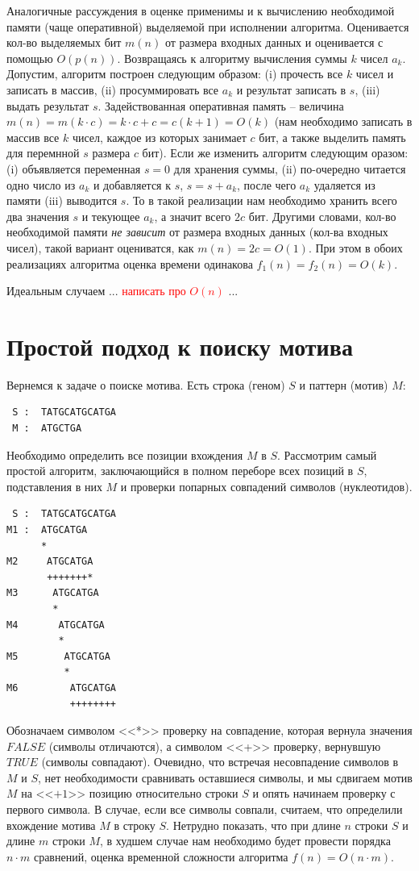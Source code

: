 \documentclass[letterpaper, 11pt]{article}
\begin{document}
Аналогичные рассуждения в оценке применимы и к вычислению необходимой памяти (чаще оперативной) выделяемой
при исполнении алгоритма. Оценивается кол-во выделяемых бит $m(n)$ от размера входных данных и оценивается с помощью
$O(p(n))$. Возвращаясь к алгоритму вычисления суммы $k$ чисел $a_k$. Допустим, алгоритм построен следующим образом: (i) прочесть все $k$ чисел и записать в массив, (ii) просуммировать все $a_k$ и результат записать в $s$, (iii) выдать результат $s$. Задействованная оперативная память -- величина $m(n) = m(k \cdot c) = k \cdot c + c = c(k + 1) = O(k)$ (нам необходимо записать в массив все $k$ чисел, каждое из которых занимает $c$ бит, а также выделить память для перемнной $s$ размера $c$ бит). Если же изменить алгоритм следующим оразом: (i) объявляется переменная $s = 0$ для хранения суммы, (ii) по-очередно читается одно число из $a_k$ и добавляется к $s$, $s = s + a_k$, после чего $a_k$ удаляется из памяти (iii) выводится $s$. То в такой реализации нам необходимо хранить всего два значения $s$ и текующее $a_k$, а значит всего $2c$ бит. Другими словами, кол-во необходимой памяти \textit{не зависит} от размера входных данных (кол-ва входных чисел), такой вариант оцениватся, как $m(n) = 2c = O(1)$. При этом в обоих реализациях алгоритма оценка времени одинакова $f_1(n) = f_2(n) = O(k)$.
\par
Идеальным случаем ... \textcolor{red}{написать про $O(n)$} ...
\section{Простой подход к поиску мотива}
\par
Вернемся к задаче о поиске мотива. Есть строка (геном) $S$ и паттерн (мотив) $M$:
\begin{verbatim}
 S :  TATGCATGCATGA
 M :  ATGCTGA
\end{verbatim}
\par
Необходимо определить все позиции вхождения $M$ в $S$. Рассмотрим самый простой алгоритм, заключающийся в полном переборе всех позиций в $S$, подставления в них $M$ и проверки попарных совпадений символов (нуклеотидов).
\begin{verbatim}
 S :  TATGCATGCATGA
M1 :  ATGCATGA
      * 
M2     ATGCATGA
       +++++++*
M3      ATGCATGA
        *
M4       ATGCATGA
         *
M5        ATGCATGA
          *
M6         ATGCATGA
           ++++++++
\end{verbatim}
\par
Обозначаем символом <<*>> проверку на совпадение, которая вернула значения $FALSE$ (символы отличаются), а символом <<+>> проверку, вернувшую $TRUE$ (символы совпадают). Очевидно, что встречая несовпадение символов в $M$ и $S$, нет необходимости сравнивать оставшиеся символы, и мы сдвигаем мотив $M$ на <<$+1$>> позицию относительно строки $S$ и опять начинаем проверку с первого символа. В случае, если все символы совпали, считаем, что определили вхождение мотива $M$ в строку $S$. Нетрудно показать, что при длине $n$ строки $S$ и длине $m$ строки $M$, в худшем случае нам необходимо будет провести порядка $n\cdot m$ сравнений, оценка временной сложности алгоритма $f(n) = O(n \cdot m)$.
\end{document}

